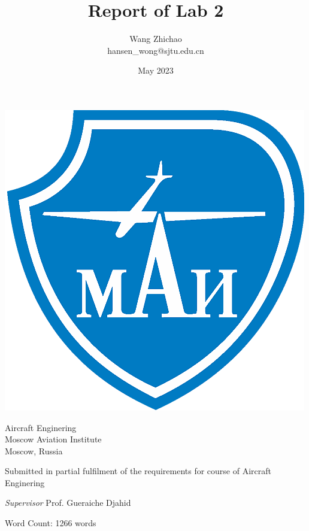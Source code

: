 \documentclass{article}
\title{Report of Lab 2}
\author{Wang Zhichao \\ [1ex] hansen\_wong@sjtu.edu.cn}
\date{May 2023}
\begin{document}
\maketitle

\begin{center}
    \includegraphics[scale=0.35]{images/mai.png}

    \vspace{0.8cm}

    Aircraft Enginering\\
    Moscow Aviation Institute\\
    Moscow, Russia

    \vspace{0.8cm}

    Submitted in partial fulfilment of the requirements for course of Aircraft Enginering

    \vspace{0.8cm}

    \textit{Supervisor} Prof. Gueraiche Djahid 

    \vspace{0.8cm}

    Word Count: 1266 words
\end{center}

\pagebreak

\end{document}
